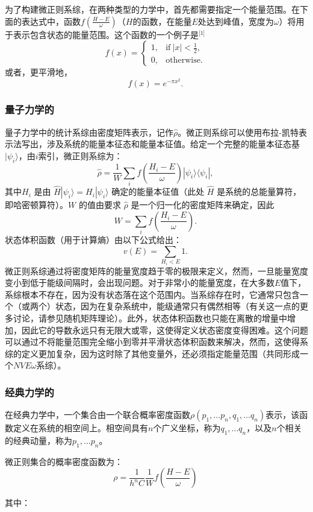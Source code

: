 为了构建微正则系综，在两种类型的力学中，首先都需要指定一个能量范围。在下面的表达式中，函数\( f \left( \frac{H - E}{\omega} \right) \)（\(H\)的函数，在能量\( E \)处达到峰值，宽度为\( \omega \)）将用于表示包含状态的能量范围。这个函数的一个例子是\(^\text{[1]}\)
\[
f(x) = 
\begin{cases} 
1, & \text{if} \ |x| < \frac{1}{2}, \\
0, & \text{otherwise.} 
\end{cases}~
\]
或者，更平滑地，
\[
f(x) = e^{-\pi x^2}.~
\]
\subsubsection{量子力学的}
量子力学中的统计系综由密度矩阵表示，记作\( \hat{\rho} \)。微正则系综可以使用布拉-凯特表示法写出，涉及系统的能量本征态和能量本征值。给定一个完整的能量本征态基\( |\psi_i\rangle \)，由\( i \)索引，微正则系综为：
\[
\hat{\rho} = \frac{1}{W} \sum_i f \left( \frac{H_i - E}{\omega} \right) |\psi_i \rangle \langle \psi_i |,~
\]
其中\( H_i \) 是由 \( \hat{H} |\psi_i\rangle = H_i |\psi_i\rangle \) 确定的能量本征值（此处 \( \hat{H} \) 是系统的总能量算符，即哈密顿算符）。\( W \) 的值由要求 \( \hat{\rho} \) 是一个归一化的密度矩阵来确定，因此
\[
W = \sum_i f \left( \frac{H_i - E}{\omega} \right).~
\]
状态体积函数（用于计算熵）由以下公式给出：
\[
v(E) = \sum_{H_i < E} 1.~
\]
微正则系综通过将密度矩阵的能量宽度趋于零的极限来定义，然而，一旦能量宽度变小到低于能级间隔时，会出现问题。对于非常小的能量宽度，在大多数\( E \)值下，系综根本不存在，因为没有状态落在这个范围内。当系综存在时，它通常只包含一个（或两个）状态，因为在复杂系统中，能级通常只有偶然相等（有关这一点的更多讨论，请参见随机矩阵理论）。此外，状态体积函数也只能在离散的增量中增加，因此它的导数永远只有无限大或零，这使得定义状态密度变得困难。这个问题可以通过不将能量范围完全缩小到零并平滑状态体积函数来解决，然而，这使得系综的定义更加复杂，因为这时除了其他变量外，还必须指定能量范围（共同形成一个\(NVE\omega\)系综）。
\subsubsection{经典力学的}
在经典力学中，一个集合由一个联合概率密度函数\(\rho(p_1, ... p_n, q_1, ... q_n)\)表示，该函数定义在系统的相空间上。相空间具有\(n\)个广义坐标，称为\(q_1, ... q_n\)，以及\(n\)个相关的经典动量，称为\(p_1, ... p_n\)。

微正则集合的概率密度函数为：
\[
\rho = \frac{1}{h^n C} \frac{1}{W} f\left(\frac{H - E}{\omega}\right)~
\]

其中：

